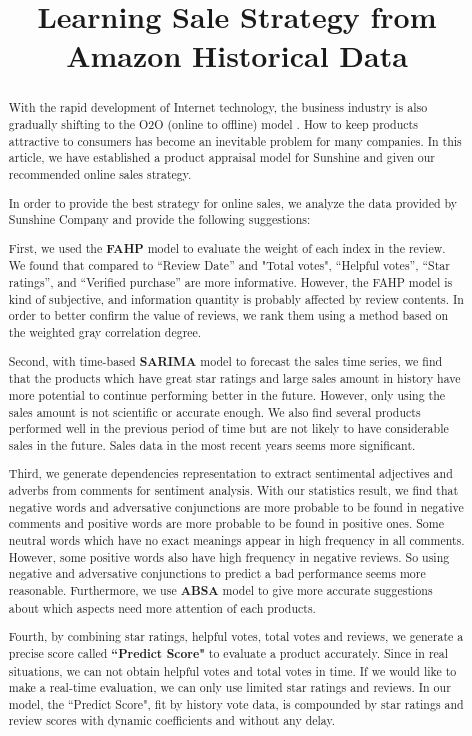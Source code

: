 \documentclass[12pt]{article}  %
\title{\textbf{Learning Sale Strategy from Amazon Historical Data}}  %
\begin{document}
\begin{abstract}
With the rapid development of Internet technology, the business industry is also gradually shifting to the O2O (online to offline) model . How to keep products attractive to consumers has become an inevitable problem for many companies. In this article, we have established a product appraisal model for Sunshine and given our recommended online sales strategy.

In order to provide the best strategy for online sales, we analyze the data provided by Sunshine Company and provide the following suggestions:

First, we used the \textbf{FAHP} model to evaluate the weight of each index in the review. We found that compared to ``Review Date'' and "Total votes", ``Helpful votes'', ``Star ratings'', and ``Verified purchase'' are more informative. However, the FAHP model is kind of subjective, and information quantity is probably affected by review contents. In order to better confirm the value of reviews, we rank them using a method based on the weighted gray correlation degree.

Second, with time-based \textbf{SARIMA} model to forecast the sales time series, we find that the products which have great star ratings and large sales amount in history have more potential to continue performing better in the future. However, only using the sales amount is not scientific or accurate enough. We also find several products performed well in the previous period of time but are not likely to have considerable sales in the future. Sales data in the most recent years seems more significant.


Third, we generate dependencies representation to extract sentimental adjectives and adverbs from comments for sentiment analysis. With our statistics result, we find that negative words and adversative conjunctions are more probable to be found in negative comments and positive words are more probable to be found in positive ones. Some neutral words which have no exact meanings appear in high frequency in all comments. However, some positive words also have high frequency in negative reviews. So using negative and adversative conjunctions to predict a bad performance seems more reasonable. Furthermore, we use \textbf{ABSA} model to give more accurate suggestions about which aspects need more attention of each products.


Fourth, by combining star ratings, helpful votes, total votes and reviews, we generate a precise score called \textbf{``Predict Score" }to evaluate a product accurately. Since in real situations, we can not obtain helpful votes and total votes in time. If  we would like to make a real-time evaluation, we can only use limited star ratings and reviews. In our model, the ``Predict Score", fit by history vote data, is compounded by star ratings and review scores with dynamic coefficients and  without any delay.



\end{abstract}
\end{document}
